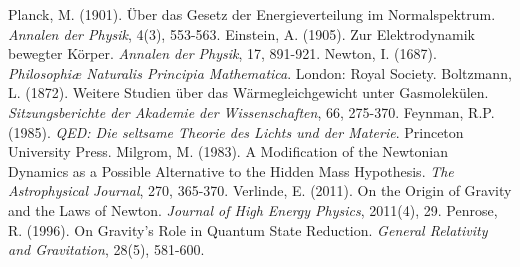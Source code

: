 \documentclass[12pt,a4paper]{article}
\begin{document}
\begin{thebibliography}{99}
 Planck, M. (1901). Über das Gesetz der Energieverteilung im Normalspektrum. \textit{Annalen der Physik}, 4(3), 553-563.
 Einstein, A. (1905). Zur Elektrodynamik bewegter Körper. \textit{Annalen der Physik}, 17, 891-921.
 Newton, I. (1687). \textit{Philosophiæ Naturalis Principia Mathematica}. London: Royal Society.
 Boltzmann, L. (1872). Weitere Studien über das Wärmegleichgewicht unter Gasmolekülen. \textit{Sitzungsberichte der Akademie der Wissenschaften}, 66, 275-370.
 Feynman, R.P. (1985). \textit{QED: Die seltsame Theorie des Lichts und der Materie}. Princeton University Press.
 Milgrom, M. (1983). A Modification of the Newtonian Dynamics as a Possible Alternative to the Hidden Mass Hypothesis. \textit{The Astrophysical Journal}, 270, 365-370.
 Verlinde, E. (2011). On the Origin of Gravity and the Laws of Newton. \textit{Journal of High Energy Physics}, 2011(4), 29.
 Penrose, R. (1996). On Gravity's Role in Quantum State Reduction. \textit{General Relativity and Gravitation}, 28(5), 581-600.
\end{thebibliography}
\end{document}
